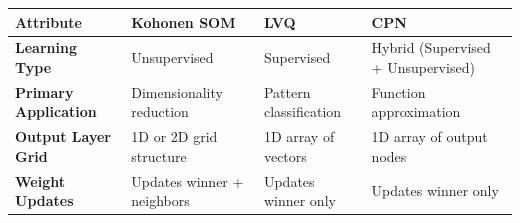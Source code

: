 \documentclass[12pt,a4paper]{article}
\renewcommand{\arraystretch}{1.45}
\begin{document}
\begin{tcolorbox}[tikzbox, title={Comparison of Competitive Networks}]
\centering
{\renewcommand{\arraystretch}{1.55}%
\begin{tabularx}{\linewidth}{|>{\bfseries}B{3.2cm}|Y|Y|Y|}
\hline
Attribute & Kohonen SOM & LVQ & CPN \\
\hline
Learning Type & Unsupervised & Supervised & Hybrid (Supervised + Unsupervised) \\
\hline
Primary Application & Dimensionality reduction & Pattern classification & Function approximation \\
\hline
Output Layer Grid & 1D or 2D grid structure & 1D array of vectors & 1D array of output nodes \\
\hline
Weight Updates & Updates winner + neighbors & Updates winner only & Updates winner only \\
\hline
\end{tabularx}}
\end{tcolorbox}
\end{document}
